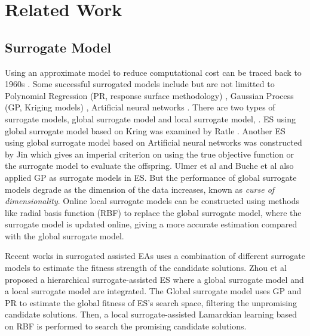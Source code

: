 




\section{Related Work}

\subsection{Surrogate Model} 

Using an approximate model to reduce computational cost can be traced back to 1960s \cite{Dunham1963}. Some successful surrogated models include but are not limitted to Polynomial Regression (PR, response surface methodology) \cite{doi:10.1080/00401706.1966.10490404}, Gaussian Process (GP, Kriging models) \cite{sacks1989}, Artificial neural networks \cite{Smith:1993:NNS:583180}. There are two types of surrogate models, global surrogate model and local surrogate model, . ES using global surrogate model based on Kring was examined by Ratle \cite{Ratle:2001:KSF:966173.966177}. Another ES using global surrogate model based on Artificial neural networks was constructed by Jin \cite{Jin02aframework} which gives an imperial criterion on using the true objective function or the surrogate model to evaluate the offspring. Ulmer et al \cite{Ulmer03evolutionstrategies} and Buche et al \cite{1424193} also applied GP as surrogate models in ES. But the performance of global surrogate models degrade as the dimension of the data increases, known as \textit{curse of dimensionality}. Online local surrogate models \cite{4033013} can be constructed using methods like radial basis function (RBF) \cite{GIANNAKOGLOU200243} to replace the global surrogate model, where the surrogate model is updated online, giving a more accurate estimation compared with the global surrogate model.





Recent works in surrogated assisted EAs uses a combination of different surrogate models to estimate the fitness strength of the candidate solutions. Zhou et al \cite{4033013} proposed a hierarchical surrogate-assisted ES where a global surrogate model and a local surrogate model are integrated. The Global surrogate model uses GP and PR to estimate the global fitness of ES's search space, filtering the unpromising candidate solutions. Then, a local surrogate-assisted Lamarckian learning based on RBF is performed to search the promising candidate solutions. 


